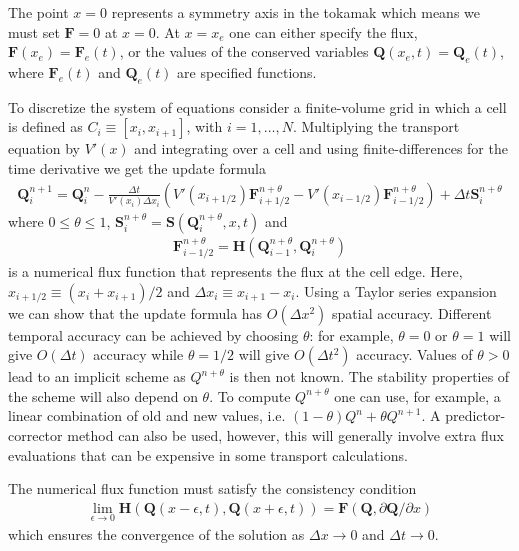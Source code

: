 \documentclass[reqno]{amsart}
\newcommand{\pfracb}[2]{\partial #1/\partial #2}
\newcommand{\mvec}[1]{\mathbf{#1}}
\theoremstyle{definition}
\begin{document}
The point $x=0$ represents a symmetry axis in the tokamak which means
we must set $\mvec{F}=0$ at $x=0$. At $x=x_e$ one can either
specify the flux, $\mvec{F}(x_e)=\mvec{F}_e(t)$, or the
values of the conserved variables $\mvec{Q}(x_e,t)=\mvec{Q}_e(t)$,
where $\mvec{F}_e(t)$ and $\mvec{Q}_e(t)$ are specified
functions.

To discretize the system of equations consider a finite-volume grid in
which a cell is defined as $C_i \equiv [x_i, x_{i+1}]$, with
$i=1,\ldots,N$. Multiplying the transport equation by $V'(x)$ and
integrating over a cell and using finite-differences for the time
derivative we get the update formula
\begin{align}
  \mvec{Q}_i^{n+1} = \mvec{Q}^n_i - \frac{\Delta t}{V'(x_i) \Delta x_i}
  \left (
    V'(x_{i+1/2}) \mvec{F}_{i+1/2}^{n+\theta} - 
    V'(x_{i-1/2}) \mvec{F}_{i-1/2}^{n+\theta}
  \right)
  +
  \Delta t \mvec{S}_i^{n+\theta} \label{eqn:update-form}
\end{align}
where $0\le\theta\le 1$,
$\mvec{S}_i^{n+\theta}=\mvec{S}(\mvec{Q}_i^{n+\theta},x,t)$ and
\begin{align}
  \mvec{F}_{i-1/2}^{n+\theta} = 
  \mvec{H}(
  \mvec{Q}_{i-1}^{n+\theta},
  \mvec{Q}_i^{n+\theta}
  ) \label{eqn:flux-func}
\end{align}
is a numerical flux function that represents the flux at the cell
edge. Here, $x_{i+1/2} \equiv (x_i+x_{i+1})/2$ and $\Delta x_i \equiv
x_{i+1}-x_i$. Using a Taylor series expansion we can show that the
update formula has $O(\Delta x^2)$ spatial accuracy. Different
temporal accuracy can be achieved by choosing $\theta$: for example,
$\theta=0$ or $\theta=1$ will give $O(\Delta t)$ accuracy while
$\theta=1/2$ will give $O(\Delta t^2)$ accuracy. Values of $\theta>0$
lead to an implicit scheme as $Q^{n+\theta}$ is then not known. The
stability properties of the scheme will also depend on $\theta$. To
compute $Q^{n+\theta}$ one can use, for example, a linear combination
of old and new values, i.e. $(1-\theta)Q^n + \theta Q^{n+1}$. A
predictor-corrector method can also be used, however, this will
generally involve extra flux evaluations that can be expensive in some
transport calculations.

The numerical flux function must satisfy the consistency
condition
\begin{align}
  \lim_{\epsilon\rightarrow 0} \mvec{H}
  \left(
    \mvec{Q}(x-\epsilon,t),
    \mvec{Q}(x+\epsilon,t)
  \right)
  =
  \mvec{F}(\mvec{Q},\pfracb{\mvec{Q}}{x})
\end{align}
which ensures the convergence of the solution as $\Delta x \rightarrow
0$ and $\Delta t \rightarrow 0$.
\end{document}
